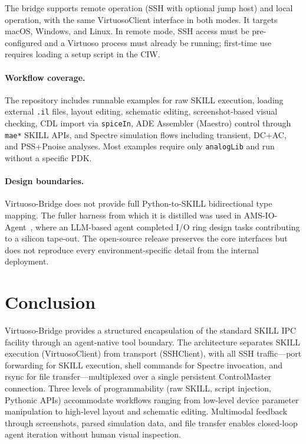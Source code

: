 \documentclass[lettersize,journal]{ieee_template/IEEEtran}
\begin{document}
The bridge supports remote operation (SSH with optional jump host) and local operation, with the same VirtuosoClient interface in both modes. It targets macOS, Windows, and Linux. In remote mode, SSH access must be pre-configured and a Virtuoso process must already be running; first-time use requires loading a setup script in the CIW.

\paragraph{Workflow coverage.} The repository includes runnable examples for raw SKILL execution, loading external \texttt{.il} files, layout editing, schematic editing, screenshot-based visual checking, CDL import via \texttt{spiceIn}, ADE Assembler (Maestro) control through \texttt{mae*} SKILL APIs, and Spectre simulation flows including transient, DC+AC, and PSS+Pnoise analyses. Most examples require only \texttt{analogLib} and run without a specific PDK.

\paragraph{Design boundaries.} Virtuoso-Bridge does not provide full Python-to-SKILL bidirectional type mapping. The fuller harness from which it is distilled was used in AMS-IO-Agent~\cite{amsioagent}, where an LLM-based agent completed I/O ring design tasks contributing to a silicon tape-out. The open-source release preserves the core interfaces but does not reproduce every environment-specific detail from the internal deployment.

\section{Conclusion}

Virtuoso-Bridge provides a structured encapsulation of the standard SKILL IPC facility through an agent-native tool boundary. The architecture separates SKILL execution (VirtuosoClient) from transport (SSHClient), with all SSH traffic---port forwarding for SKILL execution, shell commands for Spectre invocation, and rsync for file transfer---multiplexed over a single persistent ControlMaster connection. Three levels of programmability (raw SKILL, script injection, Pythonic APIs) accommodate workflows ranging from low-level device parameter manipulation to high-level layout and schematic editing. Multimodal feedback through screenshots, parsed simulation data, and file transfer enables closed-loop agent iteration without human visual inspection.
\end{document}
